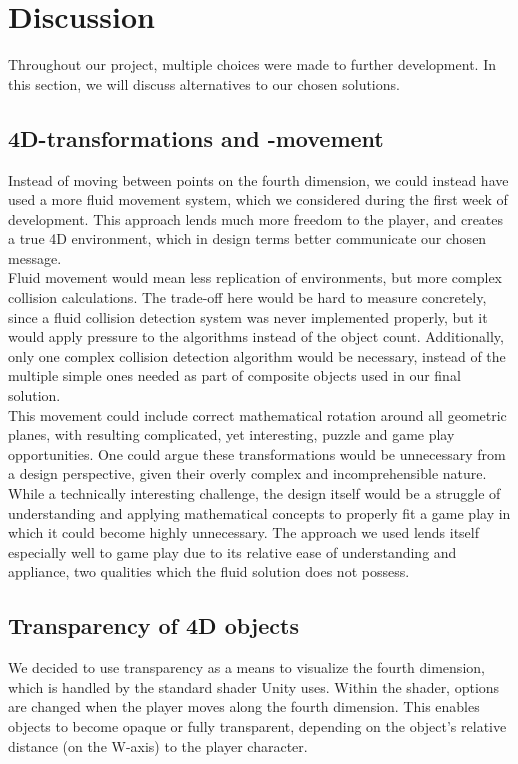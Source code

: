 \section{Discussion}
Throughout our project, multiple choices were made to further development. In this section, we will discuss alternatives to our chosen solutions.

\subsection{4D-transformations and -movement}
Instead of moving between points on the fourth dimension, we could instead have used a more fluid movement system, which we considered during the first week of development. This approach lends much more freedom to the player, and creates a true 4D environment, which in design terms better communicate our chosen message.\\

Fluid movement would mean less replication of environments, but more complex collision calculations. The trade-off here would be hard to measure concretely, since a fluid collision detection system was never implemented properly, but it would apply pressure to the algorithms instead of the object count. Additionally, only one complex collision detection algorithm would be necessary, instead of the multiple simple ones needed as part of composite objects used in our final solution.\\

This movement could include correct mathematical rotation around all geometric planes, with resulting complicated, yet interesting, puzzle and game play opportunities. One could argue these transformations would be unnecessary from a design perspective, given their overly complex and incomprehensible nature.\\

While a technically interesting challenge, the design itself would be a struggle of understanding and applying mathematical concepts to properly fit a game play in which it could become highly unnecessary. The approach we used lends itself especially well to game play due to its relative ease of understanding and appliance, two qualities which the fluid solution does not possess.

\subsection{Transparency of 4D objects}
We decided to use transparency as a means to visualize the fourth dimension, which is handled by the standard shader Unity uses. Within the shader, options are changed when the player moves along the fourth dimension. This enables objects to become opaque or fully transparent, depending on the object's relative distance (on the W-axis) to the player character.\\

